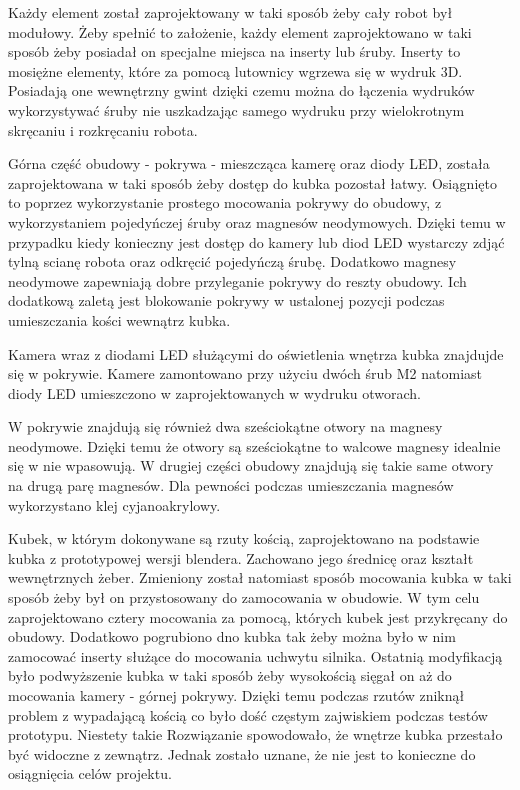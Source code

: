 Każdy element został zaprojektowany w taki sposób żeby cały robot był modułowy. Żeby spełnić to założenie, każdy element
zaprojektowano w taki sposób żeby posiadał on specjalne miejsca na inserty lub śruby. Inserty to mosiężne elementy, które za pomocą lutownicy wgrzewa się
w wydruk 3D. Posiadają one wewnętrzny gwint dzięki czemu można do łączenia wydruków wykorzystywać śruby nie uszkadzając samego wydruku przy 
wielokrotnym skręcaniu i rozkręcaniu robota.

Górna część obudowy - pokrywa - mieszcząca kamerę oraz diody LED, została zaprojektowana w taki sposób żeby dostęp do kubka pozostał łatwy. Osiągnięto to
poprzez wykorzystanie prostego mocowania pokrywy do obudowy, z wykorzystaniem pojedyńczej śruby oraz magnesów neodymowych. Dzięki temu w przypadku kiedy konieczny 
jest dostęp do kamery lub diod LED wystarczy zdjąć tylną scianę robota oraz odkręcić pojedyńczą śrubę. Dodatkowo magnesy neodymowe zapewniają
dobre przyleganie pokrywy do reszty obudowy. Ich dodatkową zaletą jest blokowanie pokrywy w ustalonej pozycji podczas umieszczania kości wewnątrz
kubka.

Kamera wraz z diodami LED służącymi do oświetlenia wnętrza kubka znajdujde się w pokrywie. Kamere zamontowano przy użyciu dwóch śrub M2 natomiast
diody LED umieszczono w zaprojektowanych w wydruku otworach.

W pokrywie znajdują się również dwa sześciokątne otwory na magnesy neodymowe. Dzięki temu że otwory są sześciokątne to walcowe magnesy idealnie
się w nie wpasowują. W drugiej części obudowy znajdują się takie same otwory na drugą parę magnesów. Dla pewności podczas umieszczania magnesów 
wykorzystano klej cyjanoakrylowy.

Kubek, w którym dokonywane są rzuty kością, zaprojektowano na podstawie kubka z prototypowej wersji blendera. Zachowano jego średnicę oraz kształt wewnętrznych
żeber. Zmieniony został natomiast sposób mocowania kubka w taki sposób żeby był on przystosowany do zamocowania w obudowie. W tym celu zaprojektowano
cztery mocowania za pomocą, których kubek jest przykręcany do obudowy. Dodatkowo pogrubiono dno kubka tak żeby można było w nim zamocować inserty służące 
do mocowania uchwytu silnika. Ostatnią modyfikacją było podwyższenie kubka w taki sposób żeby wysokością sięgał on aż do mocowania kamery - górnej pokrywy.
Dzięki temu podczas rzutów zniknął problem z wypadającą kością co było dość częstym zajwiskiem podczas testów prototypu. Niestety takie Rozwiązanie
spowodowało, że wnętrze kubka przestało być widoczne z zewnątrz. Jednak zostało uznane, że nie jest to konieczne do osiągnięcia celów projektu.

